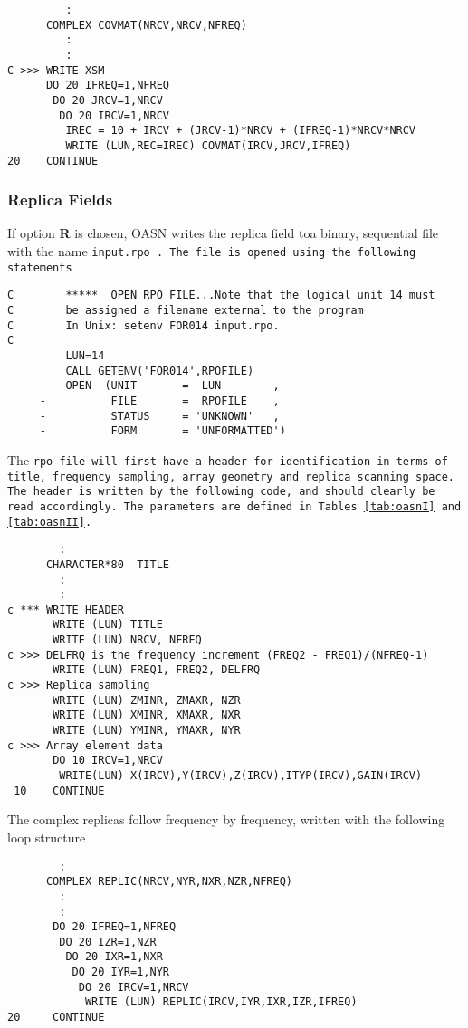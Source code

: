 \small
\begin{verbatim}
         :
      COMPLEX COVMAT(NRCV,NRCV,NFREQ)
         :
         :
C >>> WRITE XSM
      DO 20 IFREQ=1,NFREQ
       DO 20 JRCV=1,NRCV
        DO 20 IRCV=1,NRCV
         IREC = 10 + IRCV + (JRCV-1)*NRCV + (IFREQ-1)*NRCV*NRCV
         WRITE (LUN,REC=IREC) COVMAT(IRCV,JRCV,IFREQ)
20    CONTINUE
\end{verbatim}
\normalsize

\subsubsection{Replica Fields}
\label{sec:repl}

If option {\bf R} is chosen, OASN writes the replica field toa binary,
sequential file with the name \tt input.rpo \rm. The file is opened
using the following statements

\small
\begin{verbatim}
C        *****  OPEN RPO FILE...Note that the logical unit 14 must 
C        be assigned a filename external to the program
C        In Unix: setenv FOR014 input.rpo.
C
         LUN=14
         CALL GETENV('FOR014',RPOFILE)
         OPEN  (UNIT       =  LUN        ,
     -          FILE       =  RPOFILE    ,
     -          STATUS     = 'UNKNOWN'   ,
     -          FORM       = 'UNFORMATTED')
\end{verbatim}
\normalsize

The \tt rpo \rm file will first have a header for identification in
terms
of title, frequency sampling, array geometry and replica scanning
space. The header is written by the following code, and should clearly
be read accordingly. The parameters are defined in
Tables~\ref{tab:oasnI} and \ref{tab:oasnII}.

\small
\begin{verbatim}
        :
      CHARACTER*80  TITLE
        :
        :
c *** WRITE HEADER
       WRITE (LUN) TITLE
       WRITE (LUN) NRCV, NFREQ
c >>> DELFRQ is the frequency increment (FREQ2 - FREQ1)/(NFREQ-1)
       WRITE (LUN) FREQ1, FREQ2, DELFRQ
c >>> Replica sampling
       WRITE (LUN) ZMINR, ZMAXR, NZR
       WRITE (LUN) XMINR, XMAXR, NXR
       WRITE (LUN) YMINR, YMAXR, NYR
c >>> Array element data
       DO 10 IRCV=1,NRCV
        WRITE(LUN) X(IRCV),Y(IRCV),Z(IRCV),ITYP(IRCV),GAIN(IRCV)
 10    CONTINUE
\end{verbatim}
\normalsize

The complex replicas follow frequency by frequency, written with the
following loop structure

\small
\begin{verbatim}
        :
      COMPLEX REPLIC(NRCV,NYR,NXR,NZR,NFREQ)
        :
        :
       DO 20 IFREQ=1,NFREQ
        DO 20 IZR=1,NZR
         DO 20 IXR=1,NXR
          DO 20 IYR=1,NYR
           DO 20 IRCV=1,NRCV
            WRITE (LUN) REPLIC(IRCV,IYR,IXR,IZR,IFREQ)
20     CONTINUE
\end{verbatim}
\normalsize

